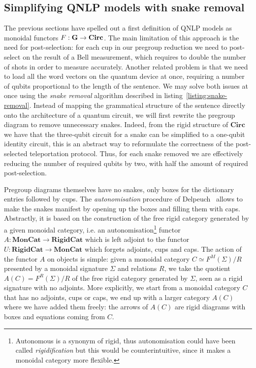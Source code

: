 
\subsection{Simplifying QNLP models with snake removal}\label{subsection:snake-removal}

The previous sections have spelled out a first definition of QNLP models as monoidal functors $F : \mathbf{G} \to \mathbf{Circ}$.
The main limitation of this approach is the need for post-selection: for each cup in our pregroup reduction we need to post-select on the result of a Bell measurement, which requires to double the number of shots in order to measure accurately.
Another related problem is that we need to load all the word vectors on the quantum device at once, requiring a number of qubits proportional to the length of the sentence.
We may solve both issues at once using the \emph{snake removal} algorithm described in listing~\ref{listing:snake-removal}.
Instead of mapping the grammatical structure of the sentence directly onto the architecture of a quantum circuit, we will first rewrite the pregroup diagram to remove unnecessary snakes.
Indeed, from the rigid structure of $\mathbf{Circ}$ we have that the three-qubit circuit for a snake can be simplified to a one-qubit identity circuit, this is an abstract way to reformulate the correctness of the post-selected teleportation protocol.
Thus, for each snake removed we are effectively reducing the number of required qubits by two, with half the amount of required post-selection.

Pregroup diagrams themselves have no snakes, only boxes for the dictionary entries followed by cups.
The \emph{autonomisation} procedure of Delpeuch~\cite{Delpeuch19} allows to make the snakes manifest by opening up the boxes and filling them with caps.
Abstractly, it is based on the construction of the free rigid category generated by a given monoidal category, i.e. an autonomisation\footnote
{Autonomous is a synonym of rigid, thus autonomisation could have been called \emph{rigidification} but this would be counterintuitive, since it makes a monoidal category more flexible.}
functor $A : \mathbf{MonCat} \to \mathbf{RigidCat}$ which is left adjoint to the functor $U : \mathbf{RigidCat} \to \mathbf{MonCat}$ which forgets adjoints, cups and caps.
The action of the functor $A$ on objects is simple: given a monoidal category $C \simeq F^M(\Sigma) / R$ presented by a monoidal signature $\Sigma$ and relations $R$, we take the quotient $A(C) = F^R(\Sigma) / R$ of the free rigid category generated by $\Sigma$, seen as a rigid signature with no adjoints.
More explicitly, we start from a monoidal category $C$ that has no adjoints, cups or caps, we end up with a larger category $A(C)$ where we have added them freely: the arrows of $A(C)$ are rigid diagrams with boxes and equations coming from $C$.

